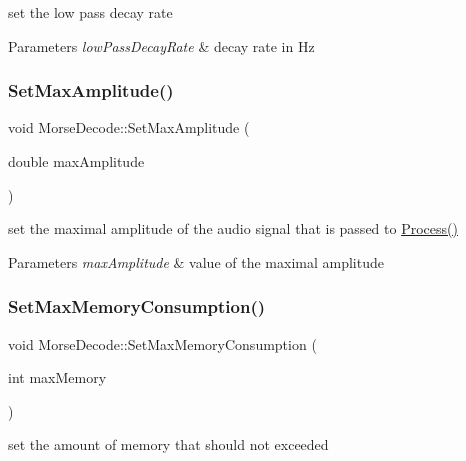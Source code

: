set the low pass decay rate 


\begin{DoxyParams}{Parameters}
{\em low\+Pass\+Decay\+Rate} & decay rate in Hz \\
\hline
\end{DoxyParams}
\mbox{\label{classMorseDecode_a1b09ba48ee9ae8c7de75e2b4dbb0fdab}} 
\subsubsection{\texorpdfstring{Set\+Max\+Amplitude()}{SetMaxAmplitude()}}
{\footnotesize\ttfamily void Morse\+Decode\+::\+Set\+Max\+Amplitude (\begin{DoxyParamCaption}\item[{double}]{max\+Amplitude }\end{DoxyParamCaption})}



set the maximal amplitude of the audio signal that is passed to \hyperlink{classMorseDecode_a9db5d2a826a6795f8a18cf123604d5a9}{Process()} 


\begin{DoxyParams}{Parameters}
{\em max\+Amplitude} & value of the maximal amplitude \\
\hline
\end{DoxyParams}
\mbox{\label{classMorseDecode_ab83ed381b8126b2fc50d9268abb1c30c}} 
\subsubsection{\texorpdfstring{Set\+Max\+Memory\+Consumption()}{SetMaxMemoryConsumption()}}
{\footnotesize\ttfamily void Morse\+Decode\+::\+Set\+Max\+Memory\+Consumption (\begin{DoxyParamCaption}\item[{int}]{max\+Memory }\end{DoxyParamCaption})}



set the amount of memory that should not exceeded 



